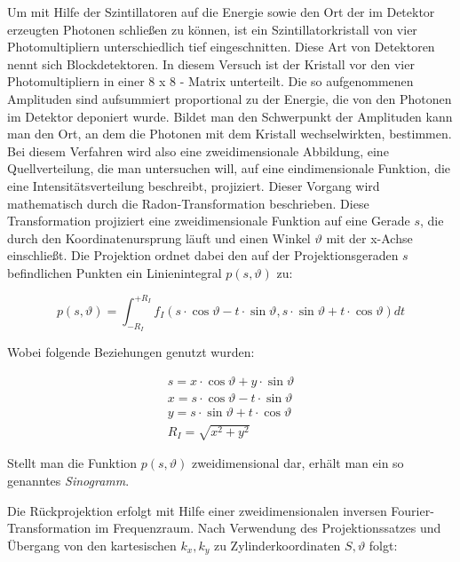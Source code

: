 \documentclass[slug=PET, room=Andreas-Schubert-Bau\,\ 424A, supervisor=Carsten\ Bittrich, coursedate=10.\ 01.\ 2020]{../../Lab_Report_LaTeX/lab_report}
\begin{document}
Um mit Hilfe der Szintillatoren auf die Energie sowie den Ort der im Detektor erzeugten Photonen
schließen zu können, ist ein Szintillatorkristall von vier Photomultipliern unterschiedlich tief
eingeschnitten. Diese Art von Detektoren nennt sich Blockdetektoren. In diesem Versuch ist der
Kristall vor den vier Photomultipliern in einer 8 x 8 - Matrix unterteilt.
Die so aufgenommenen Amplituden sind aufsummiert proportional zu der Energie, die von den
Photonen im Detektor deponiert wurde. Bildet man den Schwerpunkt der Amplituden kann man
den Ort, an dem die Photonen mit dem Kristall wechselwirkten, bestimmen.\\

Bei diesem Verfahren wird also eine zweidimensionale Abbildung, eine Quellverteilung, die man
untersuchen will, auf eine eindimensionale Funktion, die eine Intensitätsverteilung beschreibt,
projiziert.
Dieser Vorgang wird mathematisch durch die Radon-Transformation beschrieben. Diese Transformation
projiziert eine zweidimensionale Funktion auf eine Gerade \(s\), die durch den Koordinatenursprung
läuft und einen Winkel \(\vartheta\) mit der x-Achse einschließt.
Die Projektion ordnet dabei den auf der Projektionsgeraden \(s\) befindlichen Punkten ein
Linienintegral \(p(s, \vartheta)\) zu:

\begin{equation}\label{eq:linienint}
        p(s, \vartheta) = \int_{-R_I}^{+R_I} f_I(s \cdot \cos \vartheta - t \cdot \sin \vartheta, s \cdot \sin\vartheta + t \cdot \cos\vartheta) dt
\end{equation}

Wobei folgende Beziehungen genutzt wurden:

\begin{align}
        s = x \cdot \cos\vartheta + y \cdot \sin\vartheta \\
        x = s \cdot \cos \vartheta - t \cdot \sin \vartheta \\
        y = s \cdot \sin\vartheta + t \cdot \cos\vartheta \\
        R_I = \sqrt{x^2 + y^2}
\end{align}

Stellt man die Funktion \(p(s, \vartheta)\) zweidimensional dar, erhält man ein so genanntes
\emph{Sinogramm}.

Die Rückprojektion erfolgt mit Hilfe einer zweidimensionalen inversen Fourier-Transformation im
Frequenzraum. Nach Verwendung des Projektionssatzes und Übergang von den kartesischen \(k_x, k_y\)
zu Zylinderkoordinaten \(S, \vartheta\) folgt:
\end{document}
